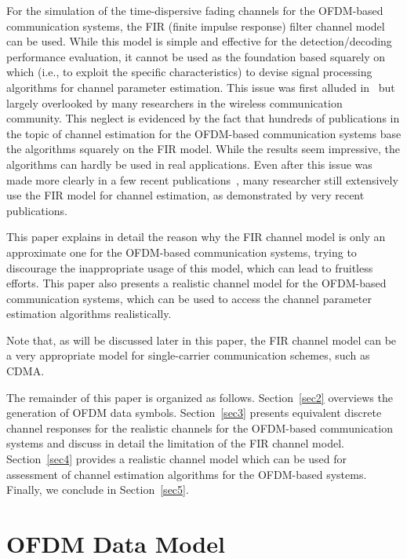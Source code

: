 \documentclass[11pt,draftnofoot,onecolumn]{IEEEtran}
\begin{document}
For the simulation of the time-dispersive fading channels for the
OFDM-based communication systems, the FIR (finite impulse response)
filter channel model~\cite{Chayat1997} can be used. While this model
is simple and effective for the detection/decoding performance
evaluation, it cannot be used as the foundation based 
squarely on which (i.e., to exploit the specific characteristics) to
devise signal processing algorithms for channel parameter
estimation. This issue was first alluded 
in~\cite{BeekEdforsSandell1995} but largely overlooked by many
researchers in the wireless communication community. This neglect is
evidenced by the fact that hundreds of publications in the topic of
channel estimation for the OFDM-based communication systems base the
algorithms squarely on the FIR model. While the results seem
impressive, the algorithms can hardly be used in real applications.
Even after this issue was made more clearly in a few recent
publications~\cite{LiuLi2003c,LiuLi2004,LiuLi2006}, many researcher
still extensively use the FIR model for channel estimation, as
demonstrated by very recent publications.

This paper explains in detail the reason why the FIR channel model
is only an approximate one for the OFDM-based 
communication systems, trying to
discourage the inappropriate usage of this model, which can lead to
fruitless efforts. This paper also presents a realistic channel
model for the OFDM-based communication systems, which can be used to
access the channel parameter estimation algorithms realistically.

Note that, as will be discussed later in this paper, the FIR channel
model can be a very appropriate model for single-carrier
communication schemes, such as CDMA.

The remainder of this paper is organized as follows. %
Section~\ref{sec2}
overviews the generation of OFDM data symbols.
Section~\ref{sec3}
presents equivalent discrete channel responses for the realistic
channels for the OFDM-based communication systems and discuss in detail the
limitation of the FIR channel model.
Section~\ref{sec4}
provides a realistic channel model which can be used for assessment
of channel estimation algorithms for the OFDM-based systems. %
Finally, we conclude in Section~\ref{sec5}.



\section{OFDM Data Model}
\label{siso_The_FIR_Channel_Model}
\label{sec2}
\end{document}
